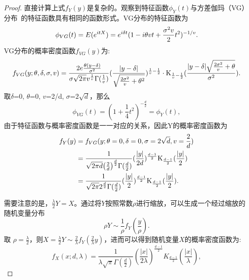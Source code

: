 \begin{proof}
\par
直接计算上式${f_Y}(y)$是复杂的。观察到特征函数${\phi_Y}(t)$与方差伽玛（VG）分布~\cite{Madan:1990:Business,Senata:2004:ApplyPro}的特征函数具有相同的函数形式。VG分布的特征函数为
\begin{equation}
	{\phi _{VG}}(t) = E({e^{itX}}) = {e^{i\delta t}}{(1 - i\theta vt + \frac{{{\sigma ^2}v}}{2}{t^2})^{ - {1 \mathord{\left/
					{\vphantom {1 v}} \right.
					\kern-\nulldelimiterspace} v}}}.
\end{equation}
VG分布的概率密度函数${f_{VG}}(y)$为:
\begin{equation}
	\begin{aligned}
		{f_{VG}}(y;\theta ,\delta ,\sigma ,v) = \frac{{2e\frac{{\theta (y - \delta )}}{{{\sigma ^2}}}}}{{\sigma \sqrt {2\pi } {v^{\frac{1}{v}}}\Gamma (\frac{1}{v})}}{(\frac{{|y - \delta |}}{{\sqrt {\frac{{2{\sigma ^2}}}{v} + {\theta ^2}} }})^{\frac{1}{v} - \frac{1}{2}}}
		\cdot {{\rm K}_{\frac{1}{v} - \frac{1}{2}}}(\frac{{|y - \delta |\sqrt {\frac{{2{\sigma ^2}}}{v} + \theta } }}{{{\sigma ^2}}}).
	\end{aligned}
\end{equation}
取$\delta$=0, $\theta $=0, $v$=2/d, $\sigma$=$2\sqrt d$，那么
\begin{equation}
	{\phi _{VG}}(t) = {(1 + \frac{1}{4}{t^2})^{ - \frac{d}{2}}} = {\phi _Y}(t),
\end{equation}
由于特征函数与概率密度函数是一一对应的关系，因此Y的概率密度函数为
\begin{equation}
	\begin{split}
		{f_Y}(y) &= {f_{VG}}(y;\theta  = 0,\delta  = 0,\sigma  = 2\sqrt d ,v = \frac{2}{d})\\
		& = \frac{1}{{\sqrt {2\pi d} {{\left( {\frac{2}{d}} \right)}^{\frac{d}{2}}}\Gamma (\frac{d}{2})}}{(\frac{{|y|}}{{2d}})^{\frac{{d - 1}}{2}}}{{\rm K}_{\frac{{d - 1}}{2}}}(\frac{{|y|}}{2})\\
		& = \frac{1}{{\sqrt {2\pi } {2^{\frac{d}{2}}}\Gamma (\frac{d}{2})}}{(\frac{{|y|}}{2})^{\frac{{d - 1}}{2}}}{{\rm K}_{\frac{{d - 1}}{2}}}(\frac{{|y|}}{2}).
	\end{split}
\end{equation}

\par
需要注意的是，$\frac{{{\lambda }}}{2}Y = X$。通过将$Y$按照常数$\rho$进行缩放，可以生成一个经过缩放的随机变量分布
\begin{equation}
	\rho Y \sim \frac{1}{\rho }{f_Y}(\frac{y}{\rho }).
\end{equation}
取 $\rho  = \frac{{{\lambda  }}}{2}$，则$X = \frac{{{\lambda }}}{2}Y \sim \frac{2}{{{\lambda }}}{f_Y}(\frac{2}{{{\lambda }}}y)$，进而可以得到随机变量$X$的概率密度函数为:
\begin{equation}
	f_{X}(x; d, \lambda) = \frac{1}{\lambda \sqrt{\pi} \Gamma(\frac{d}{2})}\left(\frac{|x|}{2\lambda} \right)^{\frac{d-1}{2}}K_{\frac{d-1}{2}}\left(\frac{|x|}{\lambda}\right),
\end{equation}
\end{proof}
